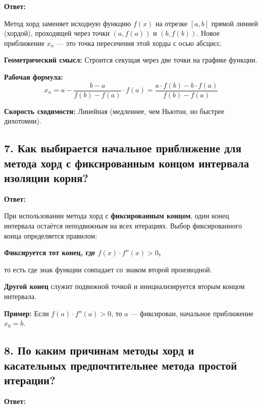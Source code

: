\documentclass[a4paper,12pt]{article}
\begin{document}
\textbf{Ответ:} 

Метод хорд заменяет исходную функцию $f(x)$ на отрезке $[a, b]$ прямой линией (хордой), проходящей через точки $(a, f(a))$ и $(b, f(b))$. Новое приближение $x_n$ --- это точка пересечения этой хорды с осью абсцисс.

\textbf{Геометрический смысл:} Строится секущая через две точки на графике функции.

\textbf{Рабочая формула:}
\[
    x_n = a - \frac{b - a}{f(b) - f(a)} \cdot f(a) = \frac{a \cdot f(b) - b \cdot f(a)}{f(b) - f(a)}
\]

\textbf{Скорость сходимости:} Линейная (медленнее, чем Ньютон, но быстрее дихотомии).

\subsection*{7. Как выбирается начальное приближение для метода хорд с фиксированным концом интервала изоляции корня?}

\textbf{Ответ:} 

При использовании метода хорд с \textbf{фиксированным концом}, один конец интервала остаётся неподвижным на всех итерациях. Выбор фиксированного конца определяется правилом:

\textbf{Фиксируется тот конец, где $f(x) \cdot f''(x) > 0$,}

то есть где знак функции совпадает со знаком второй производной.

\textbf{Другой конец} служит подвижной точкой и инициализируется вторым концом интервала.

\textbf{Пример:} Если $f(a) \cdot f''(a) > 0$, то $a$ --- фиксирован, начальное приближение $x_0 = b$.

\subsection*{8. По каким причинам методы хорд и касательных предпочтительнее метода простой итерации?}

\textbf{Ответ:} 
\end{document}
